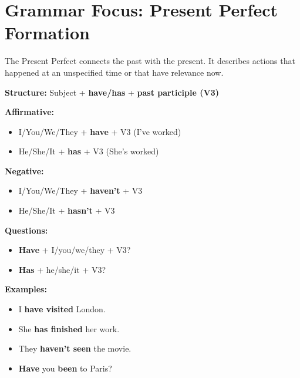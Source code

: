 \section{Grammar Focus: Present Perfect Formation}

The Present Perfect connects the past with the present. It describes actions that happened at an unspecified time or that have relevance now.

\begin{grammarbox}[title=Present Perfect Structure]
\textbf{Structure:} Subject + \textbf{have/has} + \textbf{past participle (V3)}

\textbf{Affirmative:}
\begin{itemize}
    \item I/You/We/They + \textbf{have} + V3 (I've worked)
    \item He/She/It + \textbf{has} + V3 (She's worked)
\end{itemize}

\textbf{Negative:}
\begin{itemize}
    \item I/You/We/They + \textbf{haven't} + V3
    \item He/She/It + \textbf{hasn't} + V3
\end{itemize}

\textbf{Questions:}
\begin{itemize}
    \item \textbf{Have} + I/you/we/they + V3?
    \item \textbf{Has} + he/she/it + V3?
\end{itemize}

\textbf{Examples:}
\begin{itemize}
    \item I \textbf{have visited} London. 
    \item She \textbf{has finished} her work. 
    \item They \textbf{haven't seen} the movie. 
    \item \textbf{Have} you \textbf{been} to Paris? 
\end{itemize}
\end{grammarbox}

